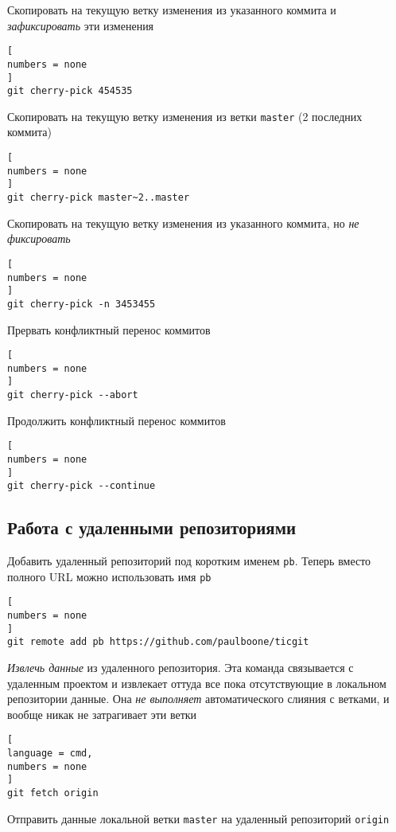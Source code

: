 \documentclass[%
	11pt,
	a4paper,
	utf8,
		]{article}
\begin{document}
Скопировать на текущую ветку изменения из указанного коммита и \emph{зафиксировать} эти изменения
\begin{lstlisting}[
numbers = none
]
git cherry-pick 454535
\end{lstlisting}

Скопировать на текущую ветку изменения из ветки \texttt{master} (2 последних коммита)
\begin{lstlisting}[
numbers = none
]
git cherry-pick master~2..master
\end{lstlisting}

Скопировать на текущую ветку изменения из указанного коммита, но \emph{не фиксировать}
\begin{lstlisting}[
numbers = none
]
git cherry-pick -n 3453455
\end{lstlisting}

Прервать конфликтный перенос коммитов
\begin{lstlisting}[
numbers = none
]
git cherry-pick --abort
\end{lstlisting}

Продолжить конфликтный перенос коммитов
\begin{lstlisting}[
numbers = none
]
git cherry-pick --continue
\end{lstlisting}


\subsection{Работа с удаленными репозиториями}

Добавить удаленный репозиторий под коротким именем \texttt{pb}. Теперь вместо полного URL можно использовать имя \texttt{pb}

\begin{lstlisting}[
numbers = none
]
git remote add pb https://github.com/paulboone/ticgit
\end{lstlisting}


\emph{Извлечь данные} из удаленного репозитория. Эта команда связывается с удаленным проектом и извлекает оттуда все пока отсутствующие в локальном репозитории данные. Она \emph{\color{red}не выполняет} автоматического слияния с ветками, и вообще никак не затрагивает эти ветки

\begin{lstlisting}[
language = cmd,
numbers = none
]
git fetch origin
\end{lstlisting}


Отправить данные локальной ветки \texttt{master} на удаленный репозиторий \texttt{origin}
\end{document}
